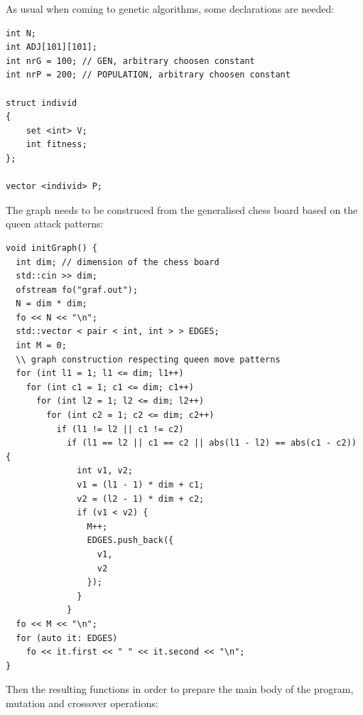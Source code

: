 \documentclass[letterpaper]{article}
\begin{document}
As usual when coming to genetic algorithms, some declarations are needed:

\begin{lstlisting}
int N;
int ADJ[101][101];
int nrG = 100; // GEN, arbitrary choosen constant
int nrP = 200; // POPULATION, arbitrary choosen constant

struct individ
{
    set <int> V;
    int fitness;
};

vector <individ> P;
\end{lstlisting}

The graph needs to be construced from the generalised chess board based on the queen attack patterns:

\begin{lstlisting}
void initGraph() {
  int dim; // dimension of the chess board
  std::cin >> dim;
  ofstream fo("graf.out");
  N = dim * dim;
  fo << N << "\n";
  std::vector < pair < int, int > > EDGES;
  int M = 0;
  \\ graph construction respecting queen move patterns
  for (int l1 = 1; l1 <= dim; l1++)
    for (int c1 = 1; c1 <= dim; c1++)
      for (int l2 = 1; l2 <= dim; l2++)
        for (int c2 = 1; c2 <= dim; c2++)
          if (l1 != l2 || c1 != c2)
            if (l1 == l2 || c1 == c2 || abs(l1 - l2) == abs(c1 - c2)) {
              int v1, v2;
              v1 = (l1 - 1) * dim + c1;
              v2 = (l2 - 1) * dim + c2;
              if (v1 < v2) {
                M++;
                EDGES.push_back({
                  v1,
                  v2
                });
              }
            }
  fo << M << "\n";
  for (auto it: EDGES)
    fo << it.first << " " << it.second << "\n";
}
\end{lstlisting}

Then the resulting functions in order to prepare the main body of the program, mutation and crossover operations:
\end{document}
